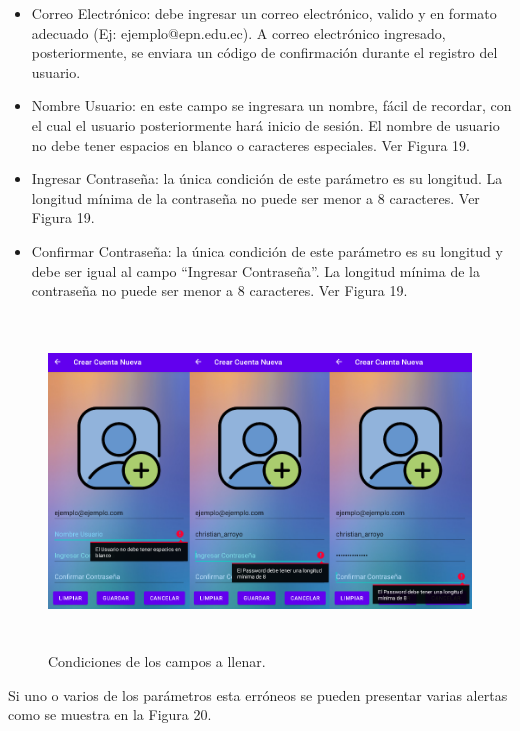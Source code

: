 \documentclass[a4paper,10pt, oneside, titlepage]{article}
\begin{document}
	\begin{itemize}
		\item Correo Electrónico: debe ingresar un correo electrónico, valido y en formato adecuado (Ej: ejemplo@epn.edu.ec). A correo electrónico ingresado, posteriormente, se enviara un código de confirmación durante el registro del usuario.
		\item Nombre Usuario: en este campo se ingresara un nombre, fácil de recordar, con el cual el usuario posteriormente hará inicio de sesión. El nombre de usuario no debe tener espacios en blanco o caracteres especiales. Ver Figura 19.
		\item Ingresar Contraseña: la única condición de este parámetro es su longitud. La longitud mínima de la contraseña no puede ser menor a 8 caracteres. Ver Figura 19.
		\item Confirmar Contraseña: la única condición de este parámetro es su longitud y debe ser igual al campo ``Ingresar Contraseña''. La longitud mínima de la contraseña no puede ser menor a 8 caracteres. Ver Figura 19.
	\end{itemize}
	\begin{figure}[!ht]
		\centering
		\includegraphics[width = 1\linewidth, height = 8.8cm]{19.png}
		\caption{Condiciones de los campos a llenar.}
	\end{figure}
	Si uno o varios de los parámetros esta erróneos se pueden presentar varias alertas como se muestra en la Figura 20.
\end{document}
